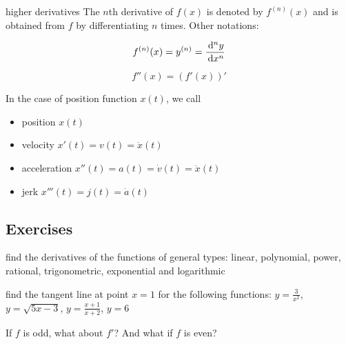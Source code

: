 \documentclass[Calculus 1 Recitation.tex]{subfiles}
\begin{document}
\begin{myleftlinebox}
	higher derivatives
	\tcblower
	The $n$th derivative of $f(x)$ is denoted by $f^{(n)}(x)$ and is obtained from $f$ by differentiating $n$ times. Other notations:

	\[f^{(n)}(x)=y^{(n)}=\frac{\,\mathrm{d}^n y}{\,\mathrm{d} x^n}\]

	\[f''(x)=(f'(x))'\]

	In the case of position function $x(t)$, we call
	\begin{itemize}
		\item position $x(t)$
		\item velocity $x'(t)=v(t)=\dot x(t)$
		\item acceleration $x''(t)=a(t)=\dot v(t)=\ddot x(t)$
		\item jerk $x'''(t)=j(t)=\dot a(t)$
	\end{itemize}
\end{myleftlinebox}

\subsection{Exercises}

\begin{myleftlinebox}
	find the derivatives of the functions of general types: linear, polynomial, power, rational, trigonometric, exponential and logarithmic
	\tcblower
	\vspace{3em}
\end{myleftlinebox}

\begin{myleftlinebox}
	find the tangent line at point $x=1$ for the following functions: $y=\frac{3}{x^2}$, $y=\sqrt{5x-3}$, $y=\frac{x+1}{x+2}$, $y=6$
	\tcblower
	\vspace{3em}
\end{myleftlinebox}

\begin{myleftlinebox}
	If $f$ is odd, what about $f'$? And what if $f$ is even?
	\tcblower
	\vspace{2em}
\end{myleftlinebox}
\end{document}
